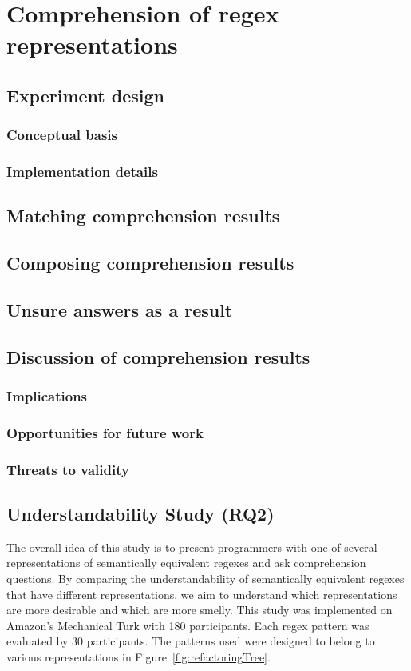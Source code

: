 \chapter{Comprehension of regex representations}
\section{Experiment design}
\subsection{Conceptual basis}
\subsection{Implementation details}

\section{Matching comprehension results}
\section{Composing comprehension results}
\section{Unsure answers as a result}

\section{Discussion of comprehension results}
\subsection{Implications}
\subsection{Opportunities for future work}
\subsection{Threats to validity}

\section{Understandability Study (RQ2)}
\label{sec:understandability}
The overall idea of this study  is to present  programmers with one of several representations of semantically equivalent regexes and ask comprehension questions. By comparing the understandability of semantically equivalent regexes that have different representations, we aim to understand which representations  are more desirable and which are more smelly.
This study was  implemented on Amazon's Mechanical Turk with 180 participants.  Each regex pattern was evaluated by 30 participants.
The patterns used were designed to belong to various representations in Figure~\ref{fig:refactoringTree}.

